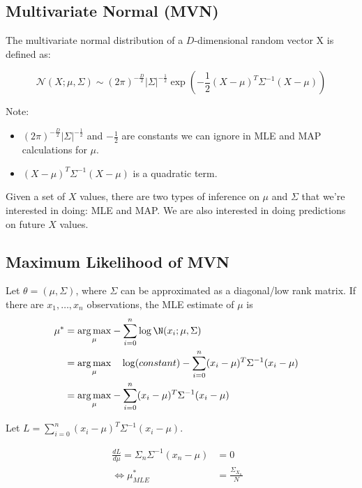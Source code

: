 \documentclass{article}
\begin{document}
\newcommand{\Norm}{{\mathcal{N}}}
\newcommand{\trace}{\on{tr}}

\subsection{Multivariate Normal (MVN)}
The multivariate normal distribution of a $D$-dimensional random vector X is defined as:

$$\Norm(X; \mu,\Sigma) \sim (2\pi)^{-\frac{D}{2}} |\Sigma|^{-\frac{1}{2}}\exp\left(-\frac{1}{2}(X-\mu)^T\Sigma^{-1} (X-\mu)\right)$$

Note: \begin{itemize}
\item $(2\pi)^{-\frac{D}{2}} |\Sigma|^{-\frac{1}{2}}$ and $-\frac{1}{2}$ are constants we can ignore in MLE and MAP calculations for $\mu$. 
\item $(X-\mu)^T\Sigma^{-1} (X-\mu)$ is a quadratic term.
\end{itemize}

\noindent Given a set of $X$ values, there are two types of inference on $\mu$ and $\Sigma$ that we're interested in doing: MLE and MAP. We are also interested in doing predictions on future $X$ values.

\subsection{Maximum Likelihood of MVN} 
Let $\theta = (\mu, \Sigma)$, where $\Sigma$ can be approximated as a diagonal/low rank matrix. If there are $x_1, \ldots, x_n$ observations, the MLE estimate of $\mu$ is 
\begin{align*}
\mu^* & = \underset{\mu}{\arg\max} -\sum_{i=0}^{n}\log \N(x_i;\mu,\Sigma) & \\
	  & = \underset{\mu}{\arg\max} \quad \log(constant) - \sum_{i=0}^{n}(x_i-\mu)^T\Sigma^{-1} (x_i-\mu) & \\
      & = \underset{\mu}{\arg\max} - \sum_{i=0}^{n}(x_i-\mu)^T\Sigma^{-1} (x_i-\mu)
\end{align*}

\noindent Let $L = \sum_{i=0}^{n}(x_i-\mu)^T\Sigma^{-1} (x_i-\mu)$.

\begin{align*}
\frac{dL}{d\mu} = \Sigma_{n} \Sigma^{-1} (x_n-\mu) &= 0 & \\
\Leftrightarrow \mu^*_{MLE} & = \frac{\Sigma_{X_n}}{N} 
\end{align*}
\end{document}
